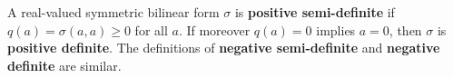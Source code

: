 A real-valued symmetric bilinear form $\sigma$ is \textbf{positive semi-definite} if $q(a) = \sigma(a, a) \geq 0$ for all $a$. If moreover $q(a) = 0$ implies $a = 0$, then $\sigma$ is \textbf{positive definite}. The definitions of \textbf{negative semi-definite} and \textbf{negative definite} are similar.
